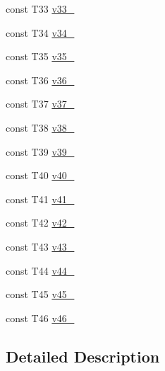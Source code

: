 \begin{DoxyCompactItemize}
\item 
const \-T33 \hyperlink{classtesting_1_1internal_1_1ValueArray46_a7a6cefe370b709c3a7b35b6d5ca8c778}{v33\-\_\-}
\item 
const \-T34 \hyperlink{classtesting_1_1internal_1_1ValueArray46_ab379e4d515d66bc57e05267515fab1d9}{v34\-\_\-}
\item 
const \-T35 \hyperlink{classtesting_1_1internal_1_1ValueArray46_a0a36112ac9b7a13572874977627ed192}{v35\-\_\-}
\item 
const \-T36 \hyperlink{classtesting_1_1internal_1_1ValueArray46_a531a52e3e8de6e982edd23c2547e4c49}{v36\-\_\-}
\item 
const \-T37 \hyperlink{classtesting_1_1internal_1_1ValueArray46_a2c4a91368c3edf933948acb4996a833d}{v37\-\_\-}
\item 
const \-T38 \hyperlink{classtesting_1_1internal_1_1ValueArray46_a364bf323d933a4adac3a9b46952ae1d3}{v38\-\_\-}
\item 
const \-T39 \hyperlink{classtesting_1_1internal_1_1ValueArray46_a0bd84ae118aa56fd251e494d1abc19fb}{v39\-\_\-}
\item 
const \-T40 \hyperlink{classtesting_1_1internal_1_1ValueArray46_ac99de9e6d59182db6141430e54f51e9c}{v40\-\_\-}
\item 
const \-T41 \hyperlink{classtesting_1_1internal_1_1ValueArray46_ad6f7550d60e8d13ade4c5033d07312e9}{v41\-\_\-}
\item 
const \-T42 \hyperlink{classtesting_1_1internal_1_1ValueArray46_a537a167baefbb86e0b3991dfd3d9437a}{v42\-\_\-}
\item 
const \-T43 \hyperlink{classtesting_1_1internal_1_1ValueArray46_a06f403913e68fabe63f09851fbdf196a}{v43\-\_\-}
\item 
const \-T44 \hyperlink{classtesting_1_1internal_1_1ValueArray46_a7fcd42ff659307eb27dce3d92c0dfd27}{v44\-\_\-}
\item 
const \-T45 \hyperlink{classtesting_1_1internal_1_1ValueArray46_afd7b4cf77fb709e9ebc572533d6ec67a}{v45\-\_\-}
\item 
const \-T46 \hyperlink{classtesting_1_1internal_1_1ValueArray46_a268a5df16444ff6ecee84ee2cf8ba5cf}{v46\-\_\-}
\end{DoxyCompactItemize}


\subsection{\-Detailed \-Description}
